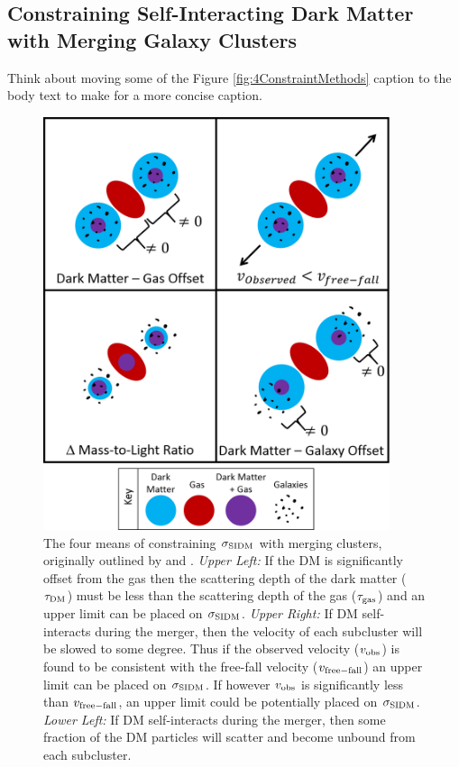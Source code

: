 \subsection{Constraining Self-Interacting Dark Matter with Merging Galaxy Clusters}

Think about moving some of the Figure \ref{fig:4ConstraintMethods} caption to the body text to make for a more concise caption.

\begin{figure}
\centering
\includegraphics[width=4in]{Chapter1/4ConstraintMethods.png}
\caption{The four means of constraining $\sigma_{\rm SIDM}$ with merging clusters, originally outlined by \citet{Markevitch:2004dl} and \citet{Randall:2008hs}. 
\emph{Upper Left:} If the DM is significantly offset from the gas then the scattering depth of the dark matter ($\tau_{\rm DM}$) must be less than the scattering depth of the gas ($\tau_{\rm gas}$) and an upper limit can be placed on $\sigma_{\rm SIDM}$.
\emph{Upper Right:} If DM self-interacts during the merger, then the velocity of each subcluster will be slowed to some degree.
Thus if the observed velocity ($v_{\rm obs}$) is found to be consistent with the free-fall velocity ($v_{\rm free-fall}$) an upper limit can be placed on $\sigma_{\rm SIDM}$.
If however $v_{\rm obs}$ is significantly less than $v_{\rm free-fall}$, an upper limit could be potentially placed on $\sigma_{\rm SIDM}$.
\emph{Lower Left:} If DM self-interacts during the merger, then some fraction of the DM particles will scatter and become unbound from each subcluster.
}
\end{figure}
